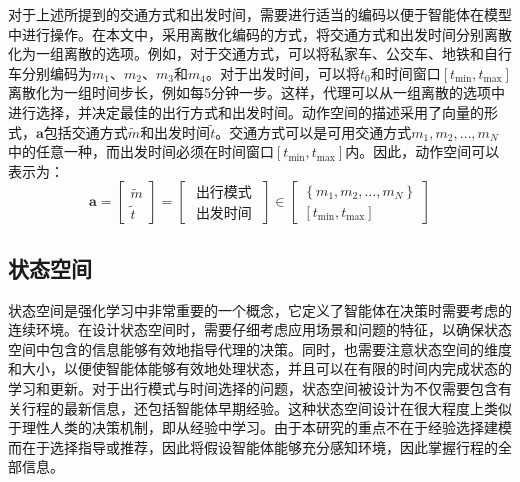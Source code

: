 对于上述所提到的交通方式和出发时间，需要进行适当的编码以便于智能体在模型中进行操作。在本文中，采用离散化编码的方式，将交通方式和出发时间分别离散化为一组离散的选项。例如，对于交通方式，可以将私家车、公交车、地铁和自行车分别编码为$m_1$、$m_2$、$m_3$和$m_4$。对于出发时间，可以将$t_0$和时间窗口$[t_{\min},t_{\max}]$离散化为一组时间步长，例如每5分钟一步。这样，代理可以从一组离散的选项中进行选择，并决定最佳的出行方式和出发时间。动作空间的描述采用了向量的形式，$\bm{a}$包括交通方式$\tilde{m}$和出发时间$\tilde{t}$。交通方式可以是可用交通方式$m_{1},m_{2}, \ldots, m_{N}$中的任意一种，而出发时间必须在时间窗口$[t_{\min }, t_{\max }]$内。因此，动作空间可以表示为：
\begin{equation}
\bm{a}=\left[\begin{array}{c}
\tilde{m} \\
\tilde{t}
\end{array}\right]=\left[\begin{array}{c}
\text { 出行模式 } \\
\text { 出发时间 }
\end{array}\right]
\in\left[\begin{array}{c}
\left\{m_{1},m_{2}, \ldots, m_{N}\right\} \\
{\left[t_{\min }, t_{\max }\right]}
\end{array}\right]
\end{equation}

\subsection{状态空间}

状态空间是强化学习中非常重要的一个概念，它定义了智能体在决策时需要考虑的连续环境。在设计状态空间时，需要仔细考虑应用场景和问题的特征，以确保状态空间中包含的信息能够有效地指导代理的决策。同时，也需要注意状态空间的维度和大小，以便使智能体能够有效地处理状态，并且可以在有限的时间内完成状态的学习和更新。对于出行模式与时间选择的问题，状态空间被设计为不仅需要包含有关行程的最新信息，还包括智能体早期经验。这种状态空间设计在很大程度上类似于理性人类的决策机制，即从经验中学习。由于本研究的重点不在于经验选择建模而在于选择指导或推荐，因此将假设智能体能够充分感知环境，因此掌握行程的全部信息。

